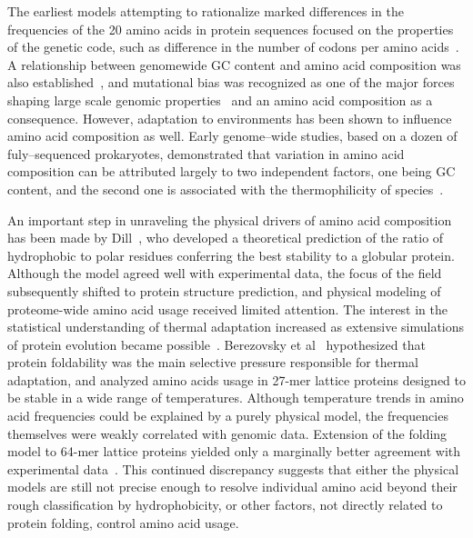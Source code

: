 \documentclass[10pt,letterpaper]{article}
\begin{document}
The earliest models attempting to rationalize marked differences in the frequencies of the 20 amino acids in protein sequences focused on the properties of the genetic code, such as difference in the number of codons per amino acids~\cite{Jukes1975Amino,King1969NonDarwinian}. A relationship between genomewide GC content and amino acid composition was also established~\cite{Knight2001Simple,Lightfield2011Across,Goncearenco2014Fundamental}, and mutational bias was recognized as one of the major forces shaping large scale genomic properties~\cite{Frank1999Asymmetric,Singer2000Nucleotide} and an amino acid composition as a consequence. However, adaptation to environments has been shown to influence amino acid composition as well. Early genome--wide studies, based on a dozen of fuly--sequenced prokaryotes, demonstrated that variation in amino acid composition can be attributed largely to two independent factors, one being GC content, and the second one is associated with the thermophilicity of species~\cite{Kreil2001Identification,Singer2003Thermophilic}.


An important step in unraveling the physical drivers of amino acid composition has been made by Dill~\cite{Dill1985Theory}, who developed a theoretical prediction of the ratio of hydrophobic to polar residues conferring the best stability to a globular protein. Although the model agreed well with experimental data, the focus of the field subsequently shifted to protein structure prediction, and physical modeling of proteome-wide amino acid usage received limited attention.  The interest in the statistical understanding of thermal adaptation increased as extensive simulations of protein evolution became possible~\cite{Taverna2002Why,Bloom2006Protein,Goldstein2008The}. Berezovsky et al~\cite{Berezovsky2007Positive} hypothesized that protein foldability was the main selective pressure responsible for thermal adaptation, and analyzed amino acids usage in 27-mer lattice proteins designed to be stable in a wide range of temperatures. Although temperature trends in amino acid frequencies could be explained by a purely physical model, the frequencies themselves were weakly correlated with genomic data. Extension of the folding model to 64-mer lattice proteins yielded only a marginally better agreement with experimental data~\cite{Venev2015Massively}. This continued discrepancy suggests that either the physical models are still not precise enough to resolve individual amino acid  beyond their rough classification by hydrophobicity, or other factors, not directly related to protein folding, control amino acid usage.
\end{document}
